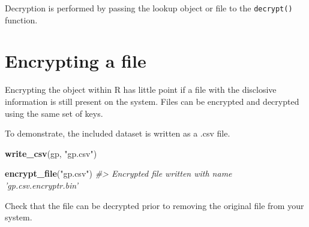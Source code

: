 \documentclass[
  12pt,
  krantz2]{krantz}
\makeatletter
\newenvironment{Shaded}{\begin{snugshade}}{\end{snugshade}}
\newcommand{\CommentTok}[1]{\textcolor[rgb]{0.56,0.35,0.01}{\textit{#1}}}
\newcommand{\DataTypeTok}[1]{\textcolor[rgb]{0.13,0.29,0.53}{#1}}
\newcommand{\KeywordTok}[1]{\textcolor[rgb]{0.13,0.29,0.53}{\textbf{#1}}}
\newcommand{\NormalTok}[1]{#1}
\newcommand{\OperatorTok}[1]{\textcolor[rgb]{0.81,0.36,0.00}{\textbf{#1}}}
\newcommand{\StringTok}[1]{\textcolor[rgb]{0.31,0.60,0.02}{#1}}
\newenvironment{kframe}{%
\medskip{}
\setlength{\fboxsep}{.8em}
 \def\at@end@of@kframe{}%
 \ifinner\ifhmode%
  \def\at@end@of@kframe{\end{minipage}}%
  \begin{minipage}{\columnwidth}%
 \fi\fi%
 \def\FrameCommand##1{\hskip\@totalleftmargin \hskip-\fboxsep
 \colorbox{shadecolor}{##1}\hskip-\fboxsep
     \hskip-\linewidth \hskip-\@totalleftmargin \hskip\columnwidth}%
 \MakeFramed {\advance\hsize-\width
   \@totalleftmargin\z@ \linewidth\hsize
   \@setminipage}}%
 {\par\unskip\endMakeFramed%
 \at@end@of@kframe}
\renewenvironment{Shaded}{\begin{kframe}}{\end{kframe}}
\makeatother
\begin{document}
Decryption is performed by passing the lookup object or file to the \texttt{decrypt()} function.

\begin{Shaded}
\end{Shaded}

\hypertarget{encrypting-a-file}{%
\section{Encrypting a file}\label{encrypting-a-file}}


Encrypting the object within R has little point if a file with the disclosive information is still present on the system.
Files can be encrypted and decrypted using the same set of keys.

To demonstrate, the included dataset is written as a .csv file.

\begin{Shaded}
\begin{Highlighting}[]
\KeywordTok{write_csv}\NormalTok{(gp, }\StringTok{"gp.csv"}\NormalTok{)}

\KeywordTok{encrypt_file}\NormalTok{(}\StringTok{"gp.csv"}\NormalTok{)}
\CommentTok{#> Encrypted file written with name 'gp.csv.encryptr.bin'}
\end{Highlighting}
\end{Shaded}

Check that the file can be decrypted prior to removing the original file from your system.
\end{document}
